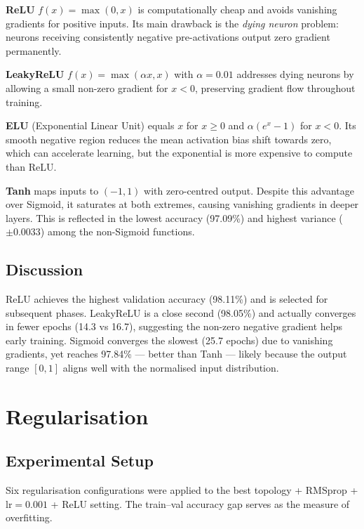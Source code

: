 \documentclass[journal,onecolumn]{IEEEtran}
\begin{document}
\textbf{ReLU} $f(x)=\max(0,x)$ is computationally cheap and avoids
vanishing gradients for positive inputs. Its main drawback is the
\emph{dying neuron} problem: neurons receiving consistently negative
pre-activations output zero gradient permanently.

\textbf{LeakyReLU} $f(x)=\max(\alpha x, x)$ with $\alpha=0.01$ addresses
dying neurons by allowing a small non-zero gradient for $x<0$, preserving
gradient flow throughout training.

\textbf{ELU} (Exponential Linear Unit) equals $x$ for $x \geq 0$ and
$\alpha(e^x - 1)$ for $x < 0$. Its smooth negative region reduces the
mean activation bias shift towards zero, which can accelerate learning,
but the exponential is more expensive to compute than ReLU.

\textbf{Tanh} maps inputs to $(-1, 1)$ with zero-centred output.
Despite this advantage over Sigmoid, it saturates at both extremes,
causing vanishing gradients in deeper layers. This is reflected in the
lowest accuracy (97.09\%) and highest variance ($\pm 0.0033$) among the
non-Sigmoid functions.

\subsection{Discussion}
ReLU achieves the highest validation accuracy (98.11\%) and is selected
for subsequent phases. LeakyReLU is a close second (98.05\%) and actually
converges in fewer epochs (14.3 vs 16.7), suggesting the non-zero negative
gradient helps early training. Sigmoid converges the slowest (25.7 epochs)
due to vanishing gradients, yet reaches 97.84\% — better than Tanh —
likely because the output range $[0,1]$ aligns well with the normalised
input distribution.

\section{Regularisation}

\subsection{Experimental Setup}
Six regularisation configurations were applied to the best
topology + RMSprop + $\text{lr}=0.001$ + ReLU setting.
The train--val accuracy gap serves as the measure of overfitting.
\end{document}
